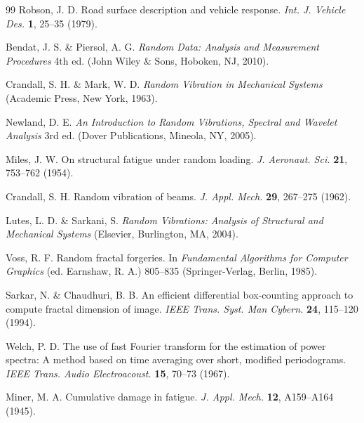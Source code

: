 \documentclass[11pt]{article}
\begin{document}
\begin{thebibliography}{99}
Robson, J. D. Road surface description and vehicle response. \textit{Int. J. Vehicle Des.} \textbf{1}, 25--35 (1979).

Bendat, J. S. \& Piersol, A. G. \textit{Random Data: Analysis and Measurement Procedures} 4th ed. (John Wiley \& Sons, Hoboken, NJ, 2010).

Crandall, S. H. \& Mark, W. D. \textit{Random Vibration in Mechanical Systems} (Academic Press, New York, 1963).

Newland, D. E. \textit{An Introduction to Random Vibrations, Spectral and Wavelet Analysis} 3rd ed. (Dover Publications, Mineola, NY, 2005).

Miles, J. W. On structural fatigue under random loading. \textit{J. Aeronaut. Sci.} \textbf{21}, 753--762 (1954).

Crandall, S. H. Random vibration of beams. \textit{J. Appl. Mech.} \textbf{29}, 267--275 (1962).

Lutes, L. D. \& Sarkani, S. \textit{Random Vibrations: Analysis of Structural and Mechanical Systems} (Elsevier, Burlington, MA, 2004).

Voss, R. F. Random fractal forgeries. In \textit{Fundamental Algorithms for Computer Graphics} (ed. Earnshaw, R. A.) 805--835 (Springer-Verlag, Berlin, 1985).

Sarkar, N. \& Chaudhuri, B. B. An efficient differential box-counting approach to compute fractal dimension of image. \textit{IEEE Trans. Syst. Man Cybern.} \textbf{24}, 115--120 (1994).

Welch, P. D. The use of fast Fourier transform for the estimation of power spectra: A method based on time averaging over short, modified periodograms. \textit{IEEE Trans. Audio Electroacoust.} \textbf{15}, 70--73 (1967).

Miner, M. A. Cumulative damage in fatigue. \textit{J. Appl. Mech.} \textbf{12}, A159--A164 (1945).

\end{thebibliography}
\end{document}
